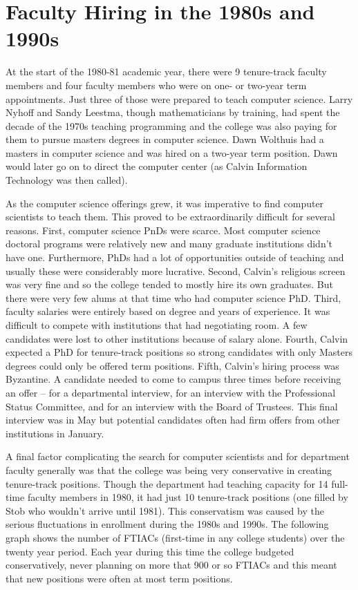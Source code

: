 \documentclass[
]{book}
\begin{document}
\hypertarget{faculty-hiring-in-the-1980s-and-1990s}{%
\section{Faculty Hiring in the 1980s and 1990s}\label{faculty-hiring-in-the-1980s-and-1990s}}

At the start of the 1980-81 academic year, there were 9 tenure-track faculty members and four faculty members who were on one- or two-year term appointments. Just three of those were prepared to teach computer science. Larry Nyhoff and Sandy Leestma, though mathematicians by training, had spent the decade of the 1970s teaching programming and the college was also paying for them to pursue masters degrees in computer science. Dawn Wolthuis had a masters in computer science and was hired on a two-year term position. Dawn would later go on to direct the computer center (as Calvin Information Technology was then called).

As the computer science offerings grew, it was imperative to find computer scientists to teach them. This proved to be extraordinarily difficult for several reasons. First, computer science PnDs were scarce. Most computer science doctoral programs were relatively new and many graduate institutions didn't have one. Furthermore, PhDs had a lot of opportunities outside of teaching and usually these were considerably more lucrative. Second, Calvin's religious screen was very fine and so the college tended to mostly hire its own graduates. But there were very few alums at that time who had computer science PhD. Third, faculty salaries were entirely based on degree and years of experience. It was difficult to compete with institutions that had negotiating room. A few candidates were lost to other institutions because of salary alone. Fourth, Calvin expected a PhD for tenure-track positions so strong candidates with only Masters degrees could only be offered term positions. Fifth, Calvin's hiring process was Byzantine. A candidate needed to come to campus three times before receiving an offer -- for a departmental interview, for an interview with the Professional Status Committee, and for an interview with the Board of Trustees. This final interview was in May but potential candidates often had firm offers from other institutions in January.

A final factor complicating the search for computer scientists and for department faculty generally was that the college was being very conservative in creating tenure-track positions. Though the department had teaching capacity for 14 full-time faculty members in 1980, it had just 10 tenure-track positions (one filled by Stob who wouldn't arrive until 1981). This conservatism was caused by the serious fluctuations in enrollment during the 1980s and 1990s. The following graph shows the number of FTIACs (first-time in any college students) over the twenty year period. Each year during this time the college budgeted conservatively, never planning on more that 900 or so FTIACs and this meant that new positions were often at most term positions.
\end{document}
